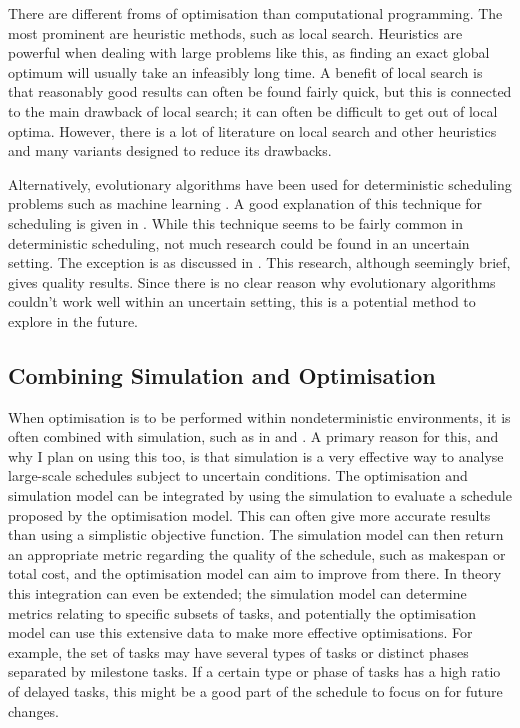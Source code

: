 \documentclass[a4paper,12pt]{article}
\begin{document}
There are different froms of optimisation than computational programming. The most prominent are heuristic methods, such as local search. Heuristics are powerful when dealing with large problems like this, as finding an exact global optimum will usually take an infeasibly long time. A benefit of local search is that reasonably good results can often be found fairly quick, but this is connected to the main drawback of local search; it can often be difficult to get out of local optima. However, there is a lot of literature on local search and other heuristics and many variants designed to reduce its drawbacks. 

Alternatively, evolutionary algorithms have been used for deterministic scheduling problems such as machine learning \cite{dorndorf1995evolution}. A good explanation of this technique for scheduling is given in \cite{cotta2007memetic}. While this technique seems to be fairly common in deterministic scheduling, not much research could be found in an uncertain setting. The exception is \cite{sevaux2002genetic} as discussed in . This research, although seemingly brief, gives quality results. Since there is no clear reason why evolutionary algorithms couldn't work well within an uncertain setting, this is a potential method to explore in the future. 

\subsection{Combining Simulation and Optimisation} \label{ss:simopt}
When optimisation is to be performed within nondeterministic environments, it is often combined with simulation, such as in \cite{de2003integrating} and \cite{bard2015integrating}. A primary reason for this, and why I plan on using this too, is that simulation is a very effective way to analyse large-scale schedules subject to uncertain conditions. The optimisation and simulation model can be integrated by using the simulation to evaluate a schedule proposed by the optimisation model. This can often give more accurate results than using a simplistic objective function. The simulation model can then return an appropriate metric regarding the quality of the schedule, such as makespan or total cost, and the optimisation model can aim to improve from there. In theory this integration can even be extended; the simulation model can determine metrics relating to specific subsets of tasks, and potentially the optimisation model can use this extensive data to make more effective optimisations. For example, the set of tasks may have several types of tasks or distinct phases separated by milestone tasks. If a certain type or phase of tasks has a high ratio of delayed tasks, this might be a good part of the schedule to focus on for future changes. 
\end{document}
